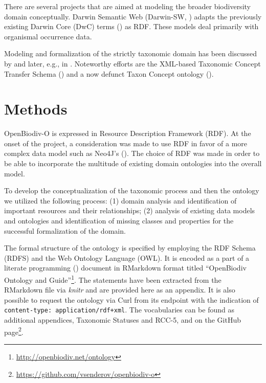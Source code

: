 There are several projects that are aimed at modeling the broader biodiversity domain conceptually. Darwin Semantic Web (Darwin-SW, \cite{baskauf_darwin-sw:_2016}) adapts the previously existing Darwin Core (DwC) terms (\cite{wieczorek_darwin_2012}) as RDF. These models deal primarily with organismal occurrence data.

Modeling and formalization of the strictly taxonomic domain has been discussed by \cite{berendsohn_concept_1995} and later, e.g., in \cite{franz_perspectives:_2009,sterner_taxonomy_2017}. Noteworthy efforts are the XML-based Taxonomic Concept Transfer Schema (\cite{taxonomic_names_and_concepts_interest_group_taxonomic_2006}) and a now defunct Taxon Concept ontology (\cite{devries_taxon_nodate}).

\section{Methods}

OpenBiodiv-O is expressed in Resource Description Framework (RDF). At the onset of the project, a consideration was made to use RDF in favor of a more complex data model such as Neo4J's (\cite{senderov_open_2016}). The choice of RDF was made in order to be able to incorporate the multitude of existing domain ontologies into the overall model.

To develop the conceptualization of the taxonomic process and then the ontology we utilized the following process: (1) domain analysis and identification of important resources and their relationships; (2) analysis of existing data models and ontologies and identification of missing classes and properties for the successful formalization of the domain.

The formal structure of the ontology is specified by employing the RDF Schema (RDFS) and the Web Ontology Language (OWL). It is encoded as a part of a literate programming (\cite{knuth_literate_1984}) document in RMarkdown format titled ``OpenBiodiv Ontology and Guide''\footnote{\href{http://openbiodiv.net/ontology}{http://openbiodiv.net/ontology}}. The statements have been extracted from the RMarkdown file via \emph{knitr} and are provided here as an appendix. It is also possible to request the ontology via Curl from its endpoint with the indication of {\tt content-type: application/rdf+xml}. The vocabularies can be found as additional appendices, Taxonomic Statuses and RCC-5, and on the GitHub page\footnote{\href{https://github.com/vsenderov/openbiodiv-o}{https://github.com/vsenderov/openbiodiv-o}}.

